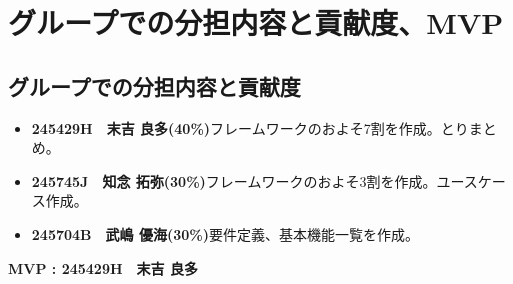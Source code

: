 \documentclass[a4paper, 11pt, titlepage]{jsarticle}
\begin{document}
\section{グループでの分担内容と貢献度、MVP}%
\subsection{グループでの分担内容と貢献度}
\begin{itemize}
    \item \textbf{245429H　末吉 良多(40\%)}フレームワークのおよそ7割を作成。とりまとめ。
    \item \textbf{245745J　知念 拓弥(30\%)}フレームワークのおよそ3割を作成。ユースケース作成。
    \item \textbf{245704B　武嶋 優海(30\%)}要件定義、基本機能一覧を作成。
\end{itemize}

\textbf{MVP : 245429H　末吉 良多}
\end{document}
